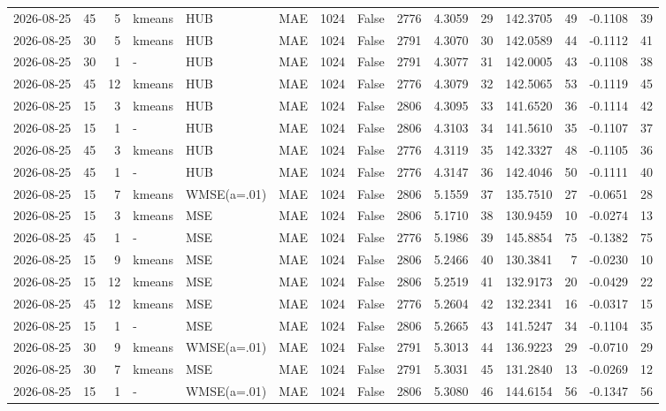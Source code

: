 \documentclass[10pt]{article}
\begin{document}
\begin{landscape}
\begin{longtable}{@{}lrrlllrcrrrrrrr@{}}
2026-08-25 & 45 & 5 & kmeans & HUB & MAE & 1024 & False & 2776 & 4.3059 & 29 & 142.3705 & 49 & -0.1108 & 39 \\
2026-08-25 & 30 & 5 & kmeans & HUB & MAE & 1024 & False & 2791 & 4.3070 & 30 & 142.0589 & 44 & -0.1112 & 41 \\
2026-08-25 & 30 & 1 & - & HUB & MAE & 1024 & False & 2791 & 4.3077 & 31 & 142.0005 & 43 & -0.1108 & 38 \\
2026-08-25 & 45 & 12 & kmeans & HUB & MAE & 1024 & False & 2776 & 4.3079 & 32 & 142.5065 & 53 & -0.1119 & 45 \\
2026-08-25 & 15 & 3 & kmeans & HUB & MAE & 1024 & False & 2806 & 4.3095 & 33 & 141.6520 & 36 & -0.1114 & 42 \\
2026-08-25 & 15 & 1 & - & HUB & MAE & 1024 & False & 2806 & 4.3103 & 34 & 141.5610 & 35 & -0.1107 & 37 \\
2026-08-25 & 45 & 3 & kmeans & HUB & MAE & 1024 & False & 2776 & 4.3119 & 35 & 142.3327 & 48 & -0.1105 & 36 \\
2026-08-25 & 45 & 1 & - & HUB & MAE & 1024 & False & 2776 & 4.3147 & 36 & 142.4046 & 50 & -0.1111 & 40 \\
2026-08-25 & 15 & 7 & kmeans & WMSE(a=.01) & MAE & 1024 & False & 2806 & 5.1559 & 37 & 135.7510 & 27 & -0.0651 & 28 \\
2026-08-25 & 15 & 3 & kmeans & MSE & MAE & 1024 & False & 2806 & 5.1710 & 38 & 130.9459 & 10 & -0.0274 & 13 \\
2026-08-25 & 45 & 1 & - & MSE & MAE & 1024 & False & 2776 & 5.1986 & 39 & 145.8854 & 75 & -0.1382 & 75 \\
2026-08-25 & 15 & 9 & kmeans & MSE & MAE & 1024 & False & 2806 & 5.2466 & 40 & 130.3841 & 7 & -0.0230 & 10 \\
2026-08-25 & 15 & 12 & kmeans & MSE & MAE & 1024 & False & 2806 & 5.2519 & 41 & 132.9173 & 20 & -0.0429 & 22 \\
2026-08-25 & 45 & 12 & kmeans & MSE & MAE & 1024 & False & 2776 & 5.2604 & 42 & 132.2341 & 16 & -0.0317 & 15 \\
2026-08-25 & 15 & 1 & - & MSE & MAE & 1024 & False & 2806 & 5.2665 & 43 & 141.5247 & 34 & -0.1104 & 35 \\
2026-08-25 & 30 & 9 & kmeans & WMSE(a=.01) & MAE & 1024 & False & 2791 & 5.3013 & 44 & 136.9223 & 29 & -0.0710 & 29 \\
2026-08-25 & 30 & 7 & kmeans & MSE & MAE & 1024 & False & 2791 & 5.3031 & 45 & 131.2840 & 13 & -0.0269 & 12 \\
2026-08-25 & 15 & 1 & - & WMSE(a=.01) & MAE & 1024 & False & 2806 & 5.3080 & 46 & 144.6154 & 56 & -0.1347 & 56 \\

\end{longtable}
\end{landscape}
\end{document}
